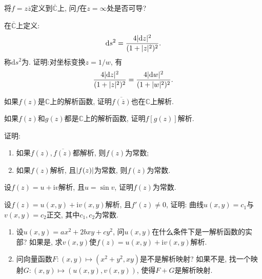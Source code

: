 \begin{yyEx}
    将$f=z\overline{z}$定义到$\overline{\mathbb{C}}$上, 问$f$在$z=\infty$处是否可导?
\end{yyEx}

\begin{yyEx}
    在$\overline{\mathbb{C}}$上定义:
    \begin{equation*}
        \mathrm{d}s^2 = \frac{4\lvert\mathrm{d}z\rvert^2}{(1+\lvert z\rvert^2)^2}.
    \end{equation*}
    称$\mathrm{d}s^2$为. 证明:对坐标变换$z = 1/w$, 有
    \begin{equation*}
        \frac{4\lvert\mathrm{d}z\rvert^2}{(1+\lvert z\rvert^2)^2} = \frac{4\lvert\mathrm{d}w\rvert^2}{(1+\lvert w\rvert^2)^2}.
    \end{equation*}
\end{yyEx}

\begin{yyEx}
    如果$f(z)$是$\mathbb{C}$上的解析函数, 证明$\overline{f(\overline{z})}$也在$\mathbb{C}$上解析.
\end{yyEx}

\begin{yyEx}
    如果$f(z)$和$g(z)$都是$\mathbb{C}$上的解析函数, 证明$f[g(z)]$解析.
\end{yyEx}

\begin{yyEx}
    证明:\begin{enumerate}
        \item  如果$f(z),\overline{f(z)}$都解析, 则$f(z)$为常数;
        \item 如果$f(z)$解析, 且$\lvert f(z)\rvert$为常数, 则$f(z)$为常数.
    \end{enumerate}
\end{yyEx}

\begin{yyEx}
    设$f(z) = u+\mathrm{i}v$解析, 且$u =\sin v$, 证明$f(z)$为常数.
\end{yyEx}

\begin{yyEx}
    设$f(z) = u(x,y) + \mathrm{i}v(x,y)$解析, 且$f'(z)\neq 0$, 证明: 曲线$u(x,y) = c_1$与$v(x,y) = c_2$正交, 其中$c_1,c_2$为常数.
\end{yyEx}

\begin{yyEx}
    \begin{enumerate}
        \item  设$u(x,y) = ax^2+2bxy+cy^2$, 问$u(x,y)$在什么条件下是一解析函数的实部? 如果是, 求$v(x,y)$使$f(z) = u(x,y) +\mathrm{i}v(x,y)$解析.
        \item 问向量函数$F:(x,y)\mapsto (x^2+y^2,xy)$是不是解析映射? 如果不是, 找一个映射$G:(x,y)\mapsto (u(x,y),v(x,y))$, 使得$F+G$是解析映射.
    \end{enumerate}
\end{yyEx}

